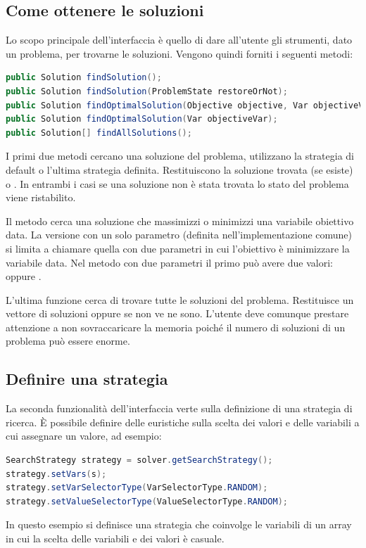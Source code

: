 \subsection{Come ottenere le soluzioni}
Lo scopo principale dell'interfaccia  è quello di dare all'utente
gli strumenti, dato un problema, per trovarne le soluzioni. Vengono quindi 
forniti i seguenti metodi:
\begin{lstlisting}[language = Java,
                   frame = single]
public Solution findSolution();
public Solution findSolution(ProblemState restoreOrNot);
public Solution findOptimalSolution(Objective objective, Var objectiveVar);
public Solution findOptimalSolution(Var objectiveVar);
public Solution[] findAllSolutions();
\end{lstlisting}
I primi due metodi cercano una soluzione del problema, utilizzano la strategia
di default o l'ultima strategia definita. Restituiscono la soluzione trovata
(se esiste) o . In entrambi i casi se una soluzione non è stata
trovata lo stato del problema viene ristabilito.

Il metodo  cerca una soluzione che massimizzi
o minimizzi una variabile obiettivo data. La versione con un solo parametro
(definita nell'implementazione comune) si limita a chiamare quella con
due parametri in cui l'obiettivo è minimizzare la variabile data. Nel metodo
con due parametri il primo può avere due valori:  
oppure .

L'ultima funzione cerca di trovare tutte le soluzioni del problema.
Restituisce un vettore di soluzioni oppure  se non ve ne sono.
L'utente deve comunque prestare attenzione a non sovraccaricare la memoria
poiché il numero di soluzioni di un problema può essere enorme.

\subsection{Definire una strategia}
La seconda funzionalità dell'interfaccia verte sulla definizione di una
strategia di ricerca. \`E possibile definire delle euristiche sulla scelta
dei valori e delle variabili a cui assegnare un valore, ad esempio:
\begin{lstlisting}[language = Java,
                   frame = single]
SearchStrategy strategy = solver.getSearchStrategy(); 		
strategy.setVars(s);
strategy.setVarSelectorType(VarSelectorType.RANDOM);
strategy.setValueSelectorType(ValueSelectorType.RANDOM);
\end{lstlisting}
In questo esempio si definisce una strategia che coinvolge le variabili di
un array  in cui la scelta delle variabili e dei valori è casuale.

